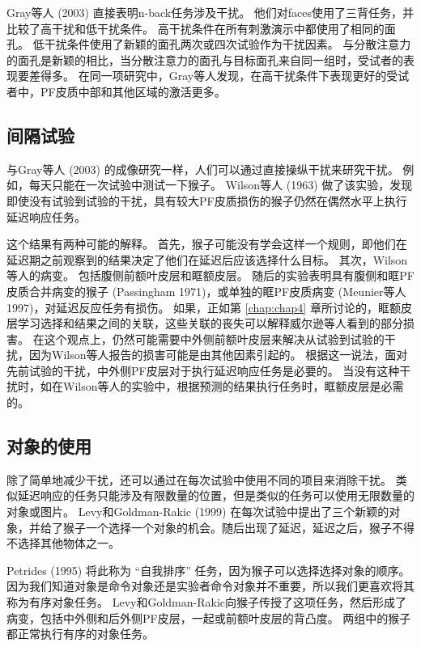 Gray等人 (2003) 直接表明n-back任务涉及干扰。
他们对faces使用了三背任务，并比较了高干扰和低干扰条件。
高干扰条件在所有刺激演示中都使用了相同的面孔。
低干扰条件使用了新颖的面孔两次或四次试验作为干扰因素。
与分散注意力的面孔是新颖的相比，当分散注意力的面孔与目标面孔来自同一组时，受试者的表现要差得多。
在同一项研究中，Gray等人发现，在高干扰条件下表现更好的受试者中，PF皮质中部和其他区域的激活更多。



\subsection{间隔试验}

与Gray等人 (2003) 的成像研究一样，人们可以通过直接操纵干扰来研究干扰。
例如，每天只能在一次试验中测试一下猴子。
Wilson等人 (1963) 做了该实验，发现即使没有试验到试验的干扰，具有较大PF皮质损伤的猴子仍然在偶然水平上执行延迟响应任务。


这个结果有两种可能的解释。
首先，猴子可能没有学会这样一个规则，即他们在延迟期之前观察到的结果决定了他们在延迟后应该选择什么目标。
其次，Wilson等人的病变。
包括腹侧前额叶皮层和眶额皮层。
随后的实验表明具有腹侧和眶PF皮质合并病变的猴子 (Passingham 1971)，或单独的眶PF皮质病变 (Meunier等人1997)，对延迟反应任务有损伤。
如果，正如第 \ref{chap:chap4} 章所讨论的，眶额皮层学习选择和结果之间的关联，这些关联的丧失可以解释威尔逊等人看到的部分损害。
在这个观点上，仍然可能需要中外侧前额叶皮层来解决从试验到试验的干扰，因为Wilson等人报告的损害可能是由其他因素引起的。
根据这一说法，面对先前试验的干扰，中外侧PF皮层对于执行延迟响应任务是必要的。
当没有这种干扰时，如在Wilson等人的实验中，根据预测的结果执行任务时，眶额皮层是必需的。



\subsection{对象的使用}

除了简单地减少干扰，还可以通过在每次试验中使用不同的项目来消除干扰。
类似延迟响应的任务只能涉及有限数量的位置，但是类似的任务可以使用无限数量的对象或图片。
Levy和Goldman-Rakic (1999) 在每次试验中提出了三个新颖的对象，并给了猴子一个选择一个对象的机会。随后出现了延迟，延迟之后，猴子不得不选择其他物体之一。


Petrides (1995) 将此称为 “自我排序” 任务，因为猴子可以选择选择对象的顺序。
因为我们知道对象是命令对象还是实验者命令对象并不重要，所以我们更喜欢将其称为有序对象任务。
Levy和Goldman-Rakic向猴子传授了这项任务，然后形成了病变，包括中外侧和后外侧PF皮层，一起或前额叶皮层的背凸度。
两组中的猴子都正常执行有序的对象任务。


